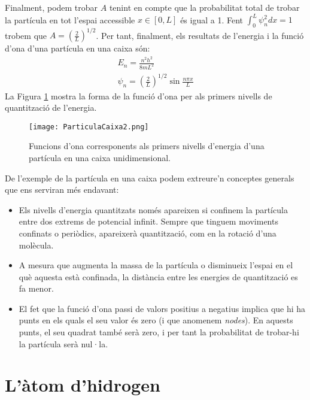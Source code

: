 \begin{mdframed}[backgroundcolor=gray!30,frametitle=Partícula en una caixa]
\[\]
Finalment, podem trobar $A$ tenint en compte que la probabilitat total de trobar la partícula en tot l'espai accessible $x\in [0,L]$ és igual a 1. Fent $\int_0^L \psi^2_n dx =1$ trobem que $A=\left( \frac{2}{L} \right)^{1/2}$. Per tant, finalment, els resultats de l'energia i la funció d'ona d'una partícula en una caixa són:
\begin{eqnarray}
E_n=\frac{n^2h^2}{8mL^2}\\
\psi_n= \left( \frac{2}{L} \right)^{1/2} \sin{\frac{n\pi x}{L}}
\end{eqnarray}
La Figura \ref{fig:ParticulaCaixa2} mostra la forma de la funció d'ona per als primers nivells de quantització de l'energia.\citep{wiki:PB}
\end{mdframed}

\begin{figure}[h]
\centering
\texttt{[image: ParticulaCaixa2.png]}
\caption{Funcions d'ona corresponents als primers nivells d'energia d'una partícula en una caixa unidimensional.}
\label{fig:ParticulaCaixa2}
\end{figure}
De l'exemple de la partícula en una caixa podem extreure'n conceptes generals que ens serviran més endavant:
\begin{itemize}
\item Els nivells d'energia quantitzats només apareixen si confinem la partícula entre dos extrems de potencial infinit. Sempre que tinguem moviments confinats o periòdics, apareixerà quantització, com en la rotació d'una molècula.
\item A mesura que augmenta la massa de la partícula o disminueix l'espai en el què aquesta està confinada, la distància entre les energies de quantització es fa menor.
\item El fet que la funció d'ona passi de valors positius a negatius implica que hi ha punts en els quals el seu valor és zero (i que anomenem \textit{nodes}). En aquests punts, el seu quadrat també serà zero, i per tant la probabilitat de trobar-hi la partícula serà nul·la.
\end{itemize}

\section{L'àtom d'hidrogen}

